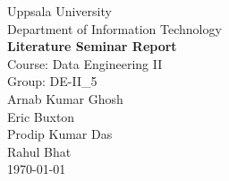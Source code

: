 \documentclass[11pt,a4paper]{article}
\begin{document}
\begin{titlepage}
  \centering
  \vspace*{2cm}
  {\large Uppsala University\\[0.3em]
   Department of Information Technology\\[2cm]}
  {\LARGE\bfseries Literature Seminar Report\\[0.5em]}
  {\large Course: Data Engineering II\\[1.5cm]}
  {\large Group: DE-II\_5\\[1.5cm]}
  {\normalsize 
  Arnab Kumar Ghosh\\[0.3em]
   Eric Buxton\\[0.3em]
   Prodip Kumar Das\\[0.3em]
   Rahul Bhat\\[0.5cm]}
  {\normalsize \today\\[3cm]}
  \vfill
\end{titlepage}

\tableofcontents
\newpage





\printbibliography
\end{document}

